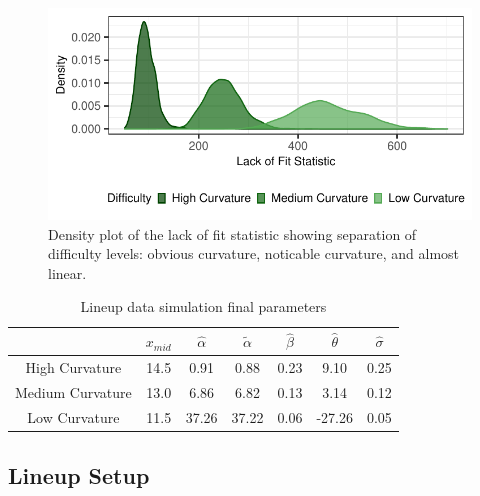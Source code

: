 \documentclass[12pt]{article}
\begin{document}
\begin{figure}[tbp]

{\centering \includegraphics[width=1\linewidth,]{logarithmic-lineups_files/figure-latex/lof-density-curves-1} 

}

\caption[Lineup parameter selection]{Density plot of the lack of fit statistic showing separation of difficulty levels: obvious curvature, noticable curvature, and almost linear.}\label{fig:lof-density-curves}
\end{figure}

\begin{table}

\caption{\label{tab:parameter-data}Lineup data simulation final parameters}
\centering
\begin{tabular}[t]{ccccccc}
\toprule
 & $x_{mid}$ & $\hat\alpha$ & $\tilde\alpha$ & $\hat\beta$ & $\hat\theta$ & $\hat\sigma$\\
\midrule
High Curvature & 14.5 & 0.91 & 0.88 & 0.23 & 9.10 & 0.25\\
Medium Curvature & 13.0 & 6.86 & 6.82 & 0.13 & 3.14 & 0.12\\
Low Curvature & 11.5 & 37.26 & 37.22 & 0.06 & -27.26 & 0.05\\
\bottomrule
\end{tabular}
\end{table}

\hypertarget{lineup-setup}{%
\subsection{Lineup Setup}\label{lineup-setup}}
\end{document}
